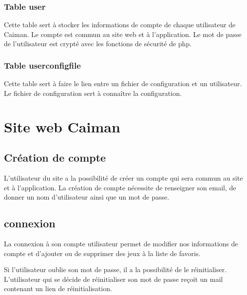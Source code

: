 \documentclass[a4paper,12pt,french]{sphinxmanual}
\begin{document}
\subsection{Table user}
\label{\detokenize{fonctionnelleBDD:table-user}}
\sphinxAtStartPar
Cette table sert à stocker les informations de compte de chaque utilisateur de Caiman. Le compte est commun au site web et à l’application. Le mot de passe de l’utilisateur est crypté avec les fonctions de sécurité de php.


\subsection{Table userconfigfile}
\label{\detokenize{fonctionnelleBDD:table-userconfigfile}}
\sphinxAtStartPar
Cette table sert à faire le lien entre un fichier de configuration et un utilisateur. Le fichier de configuration sert à connaître la configuration.


\chapter{Site web Caiman}
\label{\detokenize{fonctionnelleWeb:site-web-caiman}}\label{\detokenize{fonctionnelleWeb::doc}}

\section{Création de compte}
\label{\detokenize{fonctionnelleWeb:creation-de-compte}}
\sphinxAtStartPar
L’utilisateur du site a la possibilité de créer un compte qui sera commun au site et à l’application. La création de compte nécessite de renseigner son email, de donner un nom d’utilisateur ainsi que un mot de passe.






\section{connexion}
\label{\detokenize{fonctionnelleWeb:connexion}}
\sphinxAtStartPar
La connexion à son compte utilisateur permet de modifier nos informations de compte et d’ajouter ou de supprimer des jeux à la liste de favoris.

\sphinxAtStartPar
Si l’utilisateur oublie son mot de passe, il a la possibilité de le réinitialiser. L’utilisateur qui se décide de réinitialiser son mot de passe reçoit un mail contenant un lien de réinitialisation.
\end{document}
